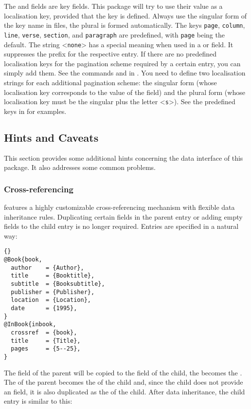 \documentclass{ltxdockit}[2011/03/25]
\newcommand*{\biber}{\sty{biber}\xspace}
\begin{document}
The  and  fields are key fields. This package will try to use their value as a localisation key, provided that the key is defined. Always use the singular form of the key name in  files, the plural is formed automatically. The keys \texttt{page}, \texttt{column}, \texttt{line}, \texttt{verse}, \texttt{section}, and \texttt{paragraph} are predefined, with \texttt{page} being the default. The string <\texttt{none}> has a special meaning when used in a  or  field. It suppresses the prefix for the respective entry. If there are no predefined localisation keys for the pagination scheme required by a certain entry, you can simply add them. See the commands  and  in . You need to define two localisation strings for each additional pagination scheme: the singular form (whose localisation key corresponds to the value of the  field) and the plural form (whose localisation key must be the singular plus the letter <\texttt{s}>). See the predefined keys in  for examples.

\subsection{Hints and Caveats}
\label{bib:cav}

This section provides some additional hints concerning the data interface of this package. It also addresses some common problems.

\subsubsection{Cross-referencing}
\label{bib:cav:ref}

\biber features a highly customizable cross-referencing mechanism with flexible data inheritance rules. Duplicating certain fields in the parent entry or adding empty fields to the child entry is no longer required. Entries are specified in a natural way:

\begin{lstlisting}[style=bibtex]{}
@Book{book,
  author	= {Author},
  title		= {Booktitle},
  subtitle	= {Booksubtitle},
  publisher	= {Publisher},
  location	= {Location},
  date		= {1995},
}
@InBook{inbook,
  crossref	= {book},
  title		= {Title},
  pages		= {5--25},
}
\end{lstlisting}
%
The  field of the parent will be copied to the  field of the child, the  becomes the . The  of the parent becomes the  of the child and, since the child does not provide an  field, it is also duplicated as the  of the child. After data inheritance, the child entry is similar to this:
\end{document}
